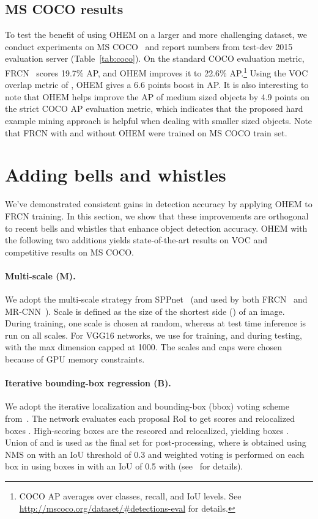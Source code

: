 \documentclass[10pt,twocolumn,letterpaper]{article}
\begin{document}
\subsection{MS COCO results}
To test the benefit of using OHEM on a larger and more challenging dataset, we conduct experiments on MS COCO~\cite{coco} and report numbers from test-dev 2015 evaluation server (Table~\ref{tab:coco}). On the standard COCO evaluation metric, FRCN~\cite{frcn} scores 19.7\% AP, and OHEM improves it to 22.6\% AP.\footnote{COCO AP averages over classes, recall, and IoU levels. See \url{http://mscoco.org/dataset/\#detections-eval} for details.} Using the VOC overlap metric of , OHEM gives a 6.6 points boost in AP. It is also interesting to note that OHEM helps improve the AP of medium sized objects by 4.9 points on the strict COCO AP evaluation metric, which indicates that the proposed hard example mining approach is helpful when dealing with smaller sized objects. Note that FRCN with and without OHEM were trained on MS COCO train set.

\section{Adding bells and whistles}
We've demonstrated consistent gains in detection accuracy by applying OHEM to FRCN training. In this section, we show that these improvements are orthogonal to recent bells and whistles that enhance object detection accuracy. OHEM with the following two additions yields state-of-the-art results on VOC and competitive results on MS COCO.


\vspace{-0.15in}
\paragraph{Multi-scale (M).} We adopt the multi-scale strategy from SPPnet~\cite{SPPnet} (and used by both FRCN~\cite{frcn} and MR-CNN~\cite{mrcnn}). Scale is defined as the size of the shortest side () of an image. During training, one scale is chosen at random, whereas at test time inference is run on all scales. For VGG16 networks, we use  for training, and  during testing, with the max dimension capped at 1000. The scales and caps were chosen because of GPU memory constraints.


\paragraph{Iterative bounding-box regression (B).} We adopt the iterative localization and bounding-box (bbox) voting scheme from~\cite{mrcnn}.
The network evaluates each proposal RoI to get scores and relocalized boxes . High-scoring  boxes are the rescored and relocalized, yielding boxes . Union of  and  is used as the final set  for post-processing, where  is obtained using NMS on  with an IoU threshold of 0.3 and weighted voting is performed on each box  in  using boxes in  with an IoU of 0.5 with  (see~\cite{mrcnn} for details).
\end{document}
